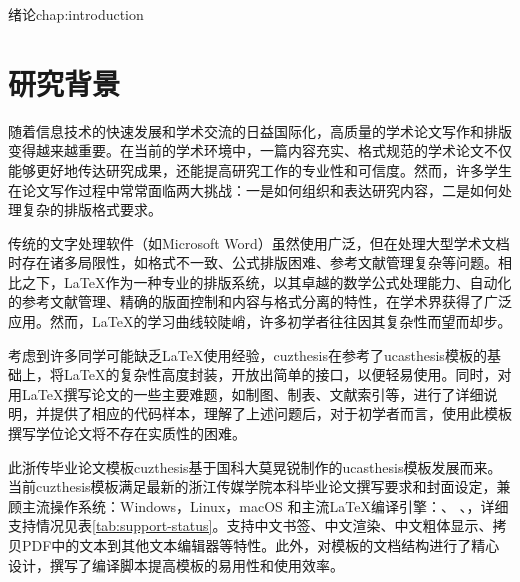 \begin{cuzchapter}{绪论}{chap:introduction}


	\section{研究背景}\label{sec:background}

	随着信息技术的快速发展和学术交流的日益国际化，高质量的学术论文写作和排版变得越来越重要。在当前的学术环境中，一篇内容充实、格式规范的学术论文不仅能够更好地传达研究成果，还能提高研究工作的专业性和可信度。然而，许多学生在论文写作过程中常常面临两大挑战：一是如何组织和表达研究内容，二是如何处理复杂的排版格式要求。

	传统的文字处理软件（如Microsoft Word）虽然使用广泛，但在处理大型学术文档时存在诸多局限性，如格式不一致、公式排版困难、参考文献管理复杂等问题。相比之下，\LaTeX{}作为一种专业的排版系统，以其卓越的数学公式处理能力、自动化的参考文献管理、精确的版面控制和内容与格式分离的特性，在学术界获得了广泛应用。然而，\LaTeX{}的学习曲线较陡峭，许多初学者往往因其复杂性而望而却步。

	考虑到许多同学可能缺乏\LaTeX{}使用经验，cuzthesis在参考了ucasthesis模板的基础上，将\LaTeX{}的复杂性高度封装，开放出简单的接口，以便轻易使用。同时，对用\LaTeX{}撰写论文的一些主要难题，如制图、制表、文献索引等，进行了详细说明，并提供了相应的代码样本，理解了上述问题后，对于初学者而言，使用此模板撰写学位论文将不存在实质性的困难。

	此浙传毕业论文模板cuzthesis基于国科大莫晃锐制作的ucasthesis模板发展而来。当前cuzthesis模板满足最新的浙江传媒学院本科毕业论文撰写要求和封面设定，兼顾主流操作系统：Windows，Linux，macOS 和主流\LaTeX{}编译引擎：、 、，详细支持情况见表\ref{tab:support-status}。支持中文书签、中文渲染、中文粗体显示、拷贝PDF中的文本到其他文本编辑器等特性。此外，对模板的文档结构进行了精心设计，撰写了编译脚本提高模板的易用性和使用效率。


\end{cuzchapter}
